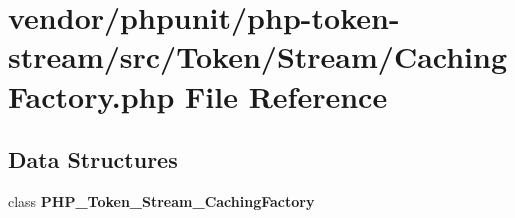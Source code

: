 \section{vendor/phpunit/php-\/token-\/stream/src/\+Token/\+Stream/\+Caching\+Factory.php File Reference}
\label{_caching_factory_8php}
\subsection*{Data Structures}
\begin{DoxyCompactItemize}
\item 
class {\bf P\+H\+P\+\_\+\+Token\+\_\+\+Stream\+\_\+\+Caching\+Factory}
\end{DoxyCompactItemize}
